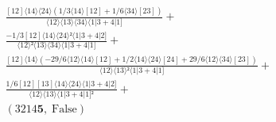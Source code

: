 \documentclass[varwidth, border=5pt]{standalone}
\begin{document}
\begin{my}
$\begin{gathered}
\scriptscriptstyle\frac{[12]⟨14⟩⟨24⟩(1/3⟨14⟩[12]+1/6⟨34⟩[23])}{⟨12⟩⟨13⟩⟨34⟩⟨1|3+4|1]} +\\
\scriptscriptstyle\frac{-1/3[12]⟨14⟩⟨24⟩²⟨1|3+4|2]}{⟨12⟩²⟨13⟩⟨34⟩⟨1|3+4|1]} +\\
\scriptscriptstyle\frac{[12]⟨14⟩(-29/6⟨12⟩⟨14⟩[12]+1/2⟨14⟩⟨24⟩[24]+29/6⟨12⟩⟨34⟩[23])}{⟨12⟩⟨13⟩²⟨1|3+4|1]} +\\
\scriptscriptstyle\frac{1/6[12][13]⟨14⟩⟨24⟩⟨1|3+4|2]}{⟨12⟩⟨13⟩⟨1|3+4|1]²} +\\
\scriptscriptstyle(3214𝟓,\;\text{False}) \phantom{+}
\end{gathered}$
\end{my}
\end{document}
